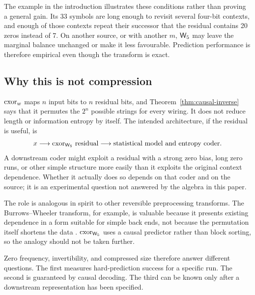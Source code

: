 The example in the introduction illustrates these conditions rather than proving a general
gain.  Its 33 symbols are long enough to revisit several four-bit contexts, and enough of those
contexts repeat their successor that the residual contains 20 zeros instead of 7.  On another
source, or with another $m$, $\mathsf{W}_{5}$ may leave the marginal balance unchanged or make it less
favourable.  Prediction performance is therefore empirical even though the transform is exact.

\subsection{Why this is not compression}

$\mathrm{cxor}_w$ maps $n$ input bits to $n$ residual bits, and Theorem~\ref{thm:causal-inverse} says that
it permutes the $2^n$ possible strings for every wiring.  It does not reduce length or information
entropy by itself.
The intended architecture, if the residual is useful, is
\[
  x
  \longrightarrow
  \text{$\mathrm{cxor}_{\mathsf{W}_{5}}$ residual}
  \longrightarrow
  \text{statistical model and entropy coder}.
\]
A downstream coder might exploit a residual with a strong zero bias, long zero runs, or other
simple structure more easily than it exploits the original context dependence.  Whether it
actually does so depends on that coder and on the source; it is an experimental question not
answered by the algebra in this paper.

The role is analogous in spirit to other reversible preprocessing transforms.  The
Burrows--Wheeler transform, for example, is valuable because it presents existing dependence in
a form suitable for simple back ends, not because the permutation itself shortens the data
\cite{burrows1994block}.  $\mathrm{cxor}_{\mathsf{W}_{5}}$ uses a causal predictor rather than block sorting, so the analogy
should not be taken further.

Zero frequency, invertibility, and compressed size therefore answer different questions.  The
first measures hard-prediction success for a specific run.  The second is guaranteed by causal
decoding.  The third can be known only after a downstream representation has been specified.
